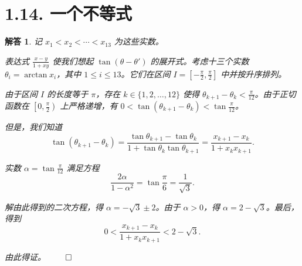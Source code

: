 \documentclass[12pt,UTF8]{ctexbook}
\theoremstyle{exercisestyle}
\theoremstyle{solutionstyle}
\newtheorem*{solution*}{解答}
\newenvironment{solution}
  {\begin{solution*}}
  {\hfill\ensuremath{\qed}\end{solution*}}
\begin{document}
\section{1.14. 一个不等式}
\begin{solution}
  记 \(x_1 < x_2 < \cdots < x_{13}\) 为这些实数。

  表达式 \(\frac{x-y}{1+xy}\) 使我们想起 \(\tan(\theta - \theta')\) 的展开式。考虑十三个实数 \(\theta_i = \arctan x_i\)，其中 \(1 \leq i \leq 13\)。它们在区间 \(I = \left[-\frac{\pi}{2}, \frac{\pi}{2}\right]\) 中并按升序排列。

  由于区间 \(I\) 的长度等于 \(\pi\)，存在 \(k \in \{1, 2, \dots, 12\}\) 使得 \(\theta_{k+1} - \theta_k < \frac{\pi}{12}\)。由于正切函数在 \(\left[0, \frac{\pi}{2}\right)\) 上严格递增，有 \(0 < \tan(\theta_{k+1} - \theta_k) < \tan \frac{\pi}{12}\)。

  但是，我们知道
  \[
  \tan(\theta_{k+1} - \theta_k) = \frac{\tan \theta_{k+1} - \tan \theta_k}{1 + \tan \theta_k \tan \theta_{k+1}} = \frac{x_{k+1} - x_k}{1 + x_k x_{k+1}}.
  \]

  实数 \(\alpha = \tan \frac{\pi}{12}\) 满足方程
  \[
  \frac{2\alpha}{1-\alpha^2} = \tan\frac{\pi}{6} = \frac{1}{\sqrt{3}}.
  \]

  解由此得到的二次方程，得 \(\alpha = -\sqrt{3} \pm 2\)。由于 \(\alpha > 0\)，得 \(\alpha = 2 - \sqrt{3}\)。最后，得到
  \[
  0 < \frac{x_{k+1} - x_k}{1 + x_k x_{k+1}} < 2 - \sqrt{3}.
  \]

  由此得证。
\end{solution}
\end{document}
